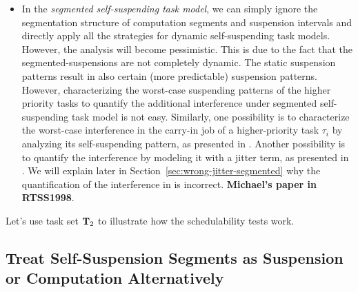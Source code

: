 \begin{table}[t]
\begin{table}[t]
\begin{itemize}
\item In the \emph{segmented self-suspending task model}, we can simply ignore the segmentation structure of computation segments and suspension intervals and directly apply all the strategies for dynamic self-suspending task models. However, the analysis will become pessimistic. This is due to the fact that the segmented-suspensions are not completely dynamic. The static suspension patterns result in also certain (more predictable) suspension patterns. However, characterizing the worst-case suspending patterns of the higher priority tasks to quantify the additional interference under segmented self-suspending task model is not easy. Similarly, one possibility is to characterize the worst-case interference in the carry-in job of a higher-priority task $\tau_i$ by analyzing its self-suspending pattern, as presented in \cite{Huang:multiseg}. Another possibility is to  quantify the interference by modeling it with a jitter term, as presented in \cite{RTCSA-BletsasA05}. We will explain later in Section~\ref{sec:wrong-jitter-segmented} why the quantification of the interference in \cite{RTCSA-BletsasA05} is incorrect. {\bf Michael's paper in RTSS1998}.
\end{itemize}


Let's use task set ${\bf T}_2$ to illustrate how the schedulability tests work. 
 
\subsection{Treat Self-Suspension Segments  as Suspension or
  Computation Alternatively}
\label{sec:suspend-or-not} 


\end{table}
\end{table}
